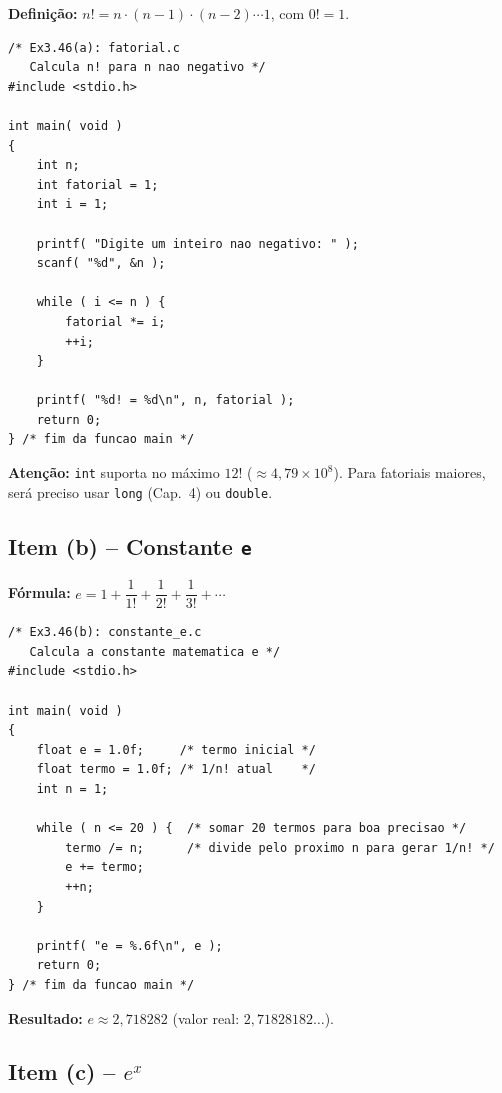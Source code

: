 \documentclass[12pt,a4paper]{article}
\begin{document}
\begin{respostabox}
\textbf{Definição:} $n! = n \cdot (n-1) \cdot (n-2) \cdots 1$, com $0! = 1$.

\begin{lstlisting}
/* Ex3.46(a): fatorial.c
   Calcula n! para n nao negativo */
#include <stdio.h>

int main( void )
{
    int n;
    int fatorial = 1;
    int i = 1;

    printf( "Digite um inteiro nao negativo: " );
    scanf( "%d", &n );

    while ( i <= n ) {
        fatorial *= i;
        ++i;
    }

    printf( "%d! = %d\n", n, fatorial );
    return 0;
} /* fim da funcao main */
\end{lstlisting}

\textbf{Atenção:} \texttt{int} suporta no máximo $12!$ ($\approx 4{,}79 \times 10^8$).
Para fatoriais maiores, será preciso usar \texttt{long} (Cap.~4) ou \texttt{double}.
\end{respostabox}

\subsection*{Item (b) -- Constante \texttt{e}}

\begin{respostabox}
\textbf{Fórmula:} $e = 1 + \dfrac{1}{1!} + \dfrac{1}{2!} + \dfrac{1}{3!} + \cdots$

\begin{lstlisting}
/* Ex3.46(b): constante_e.c
   Calcula a constante matematica e */
#include <stdio.h>

int main( void )
{
    float e = 1.0f;     /* termo inicial */
    float termo = 1.0f; /* 1/n! atual    */
    int n = 1;

    while ( n <= 20 ) {  /* somar 20 termos para boa precisao */
        termo /= n;      /* divide pelo proximo n para gerar 1/n! */
        e += termo;
        ++n;
    }

    printf( "e = %.6f\n", e );
    return 0;
} /* fim da funcao main */
\end{lstlisting}

\textbf{Resultado:} $e \approx 2{,}718282$ (valor real: $2{,}71828182\ldots$).
\end{respostabox}

\subsection*{Item (c) -- $e^x$}
\end{document}
